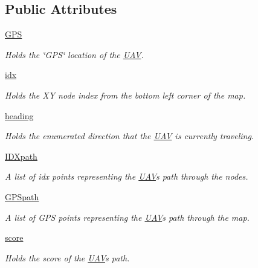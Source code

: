 \subsection*{Public Attributes}
\begin{DoxyCompactItemize}
\item 
\mbox{\hyperlink{classpath_plan_1_1_u_a_v_a759acf47734cd05447afe9e4a3f61307}{G\+PS}}
\begin{DoxyCompactList}\small\item\em Holds the \char`\"{}\+G\+P\+S\char`\"{} location of the \mbox{\hyperlink{classpath_plan_1_1_u_a_v}{U\+AV}}. \end{DoxyCompactList}\item 
\mbox{\hyperlink{classpath_plan_1_1_u_a_v_a8c6578c4b96f4704489038660a4ebe58}{idx}}
\begin{DoxyCompactList}\small\item\em Holds the XY node index from the bottom left corner of the map. \end{DoxyCompactList}\item 
\mbox{\hyperlink{classpath_plan_1_1_u_a_v_ac49fa37a2aaf8fe987f1500069c4f903}{heading}}
\begin{DoxyCompactList}\small\item\em Holds the enumerated direction that the \mbox{\hyperlink{classpath_plan_1_1_u_a_v}{U\+AV}} is currently traveling. \end{DoxyCompactList}\item 
\mbox{\hyperlink{classpath_plan_1_1_u_a_v_a640c0f9f8385d53e0742d9ef5f3a7a59}{I\+D\+Xpath}}
\begin{DoxyCompactList}\small\item\em A list of idx points representing the \mbox{\hyperlink{classpath_plan_1_1_u_a_v}{U\+AV}}\textquotesingle{}s path through the nodes. \end{DoxyCompactList}\item 
\mbox{\hyperlink{classpath_plan_1_1_u_a_v_a1d6d4797e8ac522de0da65ba882b8616}{G\+P\+Spath}}
\begin{DoxyCompactList}\small\item\em A list of G\+PS points representing the \mbox{\hyperlink{classpath_plan_1_1_u_a_v}{U\+AV}}\textquotesingle{}s path through the map. \end{DoxyCompactList}\item 
\mbox{\hyperlink{classpath_plan_1_1_u_a_v_a5f9c3173062f490e98024972e954cb1c}{score}}
\begin{DoxyCompactList}\small\item\em Holds the score of the \mbox{\hyperlink{classpath_plan_1_1_u_a_v}{U\+AV}}\textquotesingle{}s path. \end{DoxyCompactList}\item 

\end{DoxyCompactItemize}
